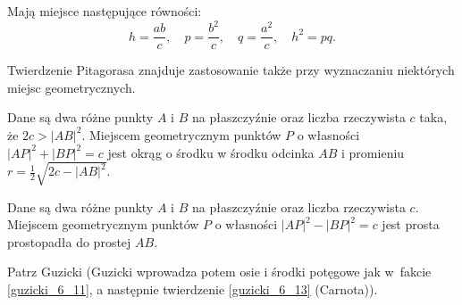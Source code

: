 \begin{proposition}
    Mają miejsce następujące równości:
    \begin{equation}
        h = \frac{ab}{c}, \quad
        p = \frac{b^2}{c}, \quad
        q = \frac{a^2}{c}, \quad
        h^2 = pq.
    \end{equation}
\end{proposition}

Twierdzenie Pitagorasa znajduje zastosowanie także przy wyznaczaniu niektórych miejsc geometrycznych.

\begin{proposition}
    Dane są dwa różne punkty $A$ i $B$ na płaszczyźnie oraz liczba rzeczywista $c$ taka, że $2c > |AB|^2$.
    Miejscem geometrycznym punktów $P$ o własności $|AP|^2 + |BP|^2 = c$ jest okrąg o środku w środku odcinka $AB$ i promieniu $r = \frac 1 2 \sqrt{2c - |AB|^2}$.
\end{proposition}

\begin{proposition}
    Dane są dwa różne punkty $A$ i $B$ na płaszczyźnie oraz liczba rzeczywista $c$.
    Miejscem geometrycznym punktów $P$ o własności $|AP|^2 - |BP|^2 = c$ jest prosta prostopadła do prostej $AB$.
\end{proposition}

Patrz Guzicki \cite[s. 170-173]{guzicki_2021} (Guzicki wprowadza potem osie i środki potęgowe jak w~fakcie \ref{guzicki_6_11}, a następnie twierdzenie \ref{guzicki_6_13} (Carnota)).

